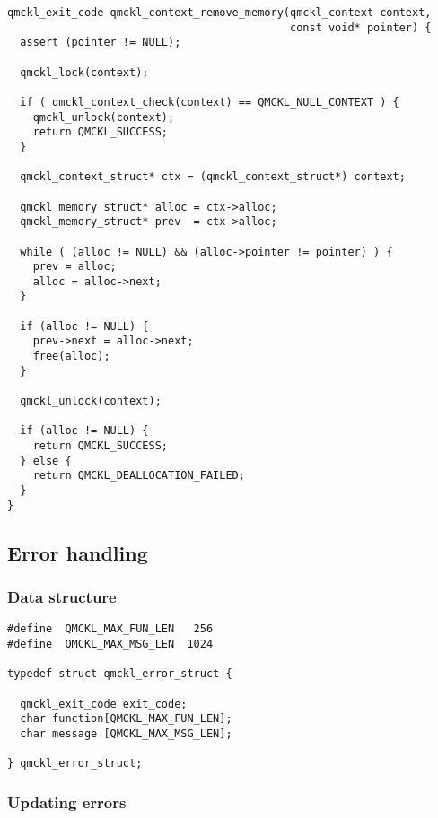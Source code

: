 \begin{verbatim}
qmckl_exit_code qmckl_context_remove_memory(qmckl_context context,
                                            const void* pointer) {
  assert (pointer != NULL);

  qmckl_lock(context);

  if ( qmckl_context_check(context) == QMCKL_NULL_CONTEXT ) {
    qmckl_unlock(context);
    return QMCKL_SUCCESS;
  }

  qmckl_context_struct* ctx = (qmckl_context_struct*) context; 

  qmckl_memory_struct* alloc = ctx->alloc;
  qmckl_memory_struct* prev  = ctx->alloc;

  while ( (alloc != NULL) && (alloc->pointer != pointer) ) {
    prev = alloc;
    alloc = alloc->next;
  }
  
  if (alloc != NULL) {
    prev->next = alloc->next;
    free(alloc);
  } 
      
  qmckl_unlock(context);

  if (alloc != NULL) {
    return QMCKL_SUCCESS;
  } else {
    return QMCKL_DEALLOCATION_FAILED;
  }
}
\end{verbatim}

\subsection{Error handling}
\label{sec:orgd61ab50}

\subsubsection{Data structure}
\label{sec:org31be6ee}

\begin{verbatim}
#define  QMCKL_MAX_FUN_LEN   256
#define  QMCKL_MAX_MSG_LEN  1024

typedef struct qmckl_error_struct {

  qmckl_exit_code exit_code;
  char function[QMCKL_MAX_FUN_LEN];
  char message [QMCKL_MAX_MSG_LEN];

} qmckl_error_struct;
\end{verbatim}

\subsubsection{Updating errors}
\label{sec:orgb2ce614}

